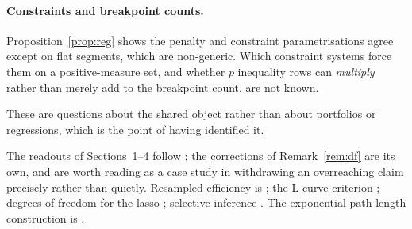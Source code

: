 \paragraph{Constraints and breakpoint counts.} Proposition~\ref{prop:reg} shows the
penalty and constraint parametrisations agree except on flat segments, which are
non-generic. Which constraint systems force them on a positive-measure set, and
whether $p$ inequality rows can \emph{multiply} rather than merely add to the
breakpoint count, are not known.

These are questions about the shared object rather than about portfolios or
regressions, which is the point of having identified it.

\begin{notes}
The readouts of Sections~1--4 follow \cite{schmelzer2026perspective}; the corrections
of Remark~\ref{rem:df} are its own, and are worth reading as a case study in
withdrawing an overreaching claim precisely rather than quietly. Resampled efficiency
is \cite{michaud1999}; the L-curve criterion \cite{hansen1992}; degrees of freedom for
the lasso \cite{zou2007df,tibshirani2012df}; selective inference
\cite{lee2016,tibshirani2016psi}. The exponential path-length construction is
\cite{mairal2012}.
\end{notes}

